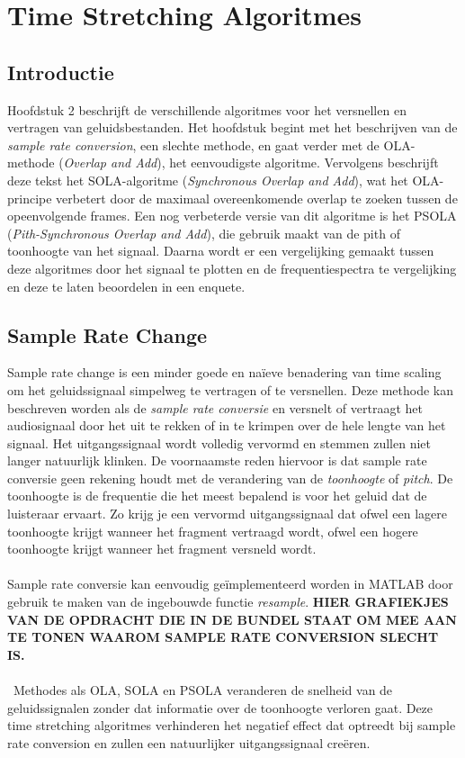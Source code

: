 \documentclass[12pt]{report}
\begin{document}
\chapter{Time Stretching Algoritmes}
\section{Introductie}
Hoofdstuk 2 beschrijft de verschillende algoritmes voor het versnellen en vertragen van geluidsbestanden. Het hoofdstuk begint met het beschrijven van de \textit{sample rate conversion}, een slechte methode, en gaat verder met de OLA-methode (\textit{Overlap and Add}), het eenvoudigste algoritme. Vervolgens beschrijft deze tekst het SOLA-algoritme (\textit{Synchronous Overlap and Add}), wat het OLA-principe verbetert door de maximaal overeenkomende overlap te zoeken tussen de opeenvolgende frames. Een nog verbeterde versie van dit algoritme is het PSOLA (\textit{Pith-Synchronous Overlap and Add}), die gebruik maakt van de pith of toonhoogte van het signaal. Daarna wordt er een vergelijking gemaakt tussen deze algoritmes door het signaal te plotten en de frequentiespectra te vergelijking en deze te laten beoordelen in een enquete. 


\section{Sample Rate Change}
Sample rate change is een minder goede en na\"{i}eve benadering van time scaling om het geluidssignaal simpelweg te vertragen of te versnellen. Deze methode kan beschreven worden als de \textit{sample rate conversie} en versnelt of vertraagt het audiosignaal door het uit te rekken of in te krimpen over de hele lengte van het signaal. Het uitgangssignaal wordt volledig vervormd en stemmen zullen niet langer natuurlijk klinken. De voornaamste reden hiervoor is dat sample rate conversie geen rekening houdt met de verandering van de \textit{toonhoogte} of \textit{pitch}. De toonhoogte is de frequentie die het meest bepalend is voor het geluid dat de luisteraar ervaart. Zo krijg je een vervormd uitgangssignaal dat ofwel een lagere toonhoogte krijgt wanneer het fragment vertraagd wordt, ofwel een hogere toonhoogte krijgt wanneer het fragment versneld wordt.\\
\\
Sample rate conversie kan eenvoudig ge\"{i}mplementeerd worden in MATLAB door gebruik te maken van de ingebouwde functie \textit{resample}. \textbf{HIER GRAFIEKJES VAN DE OPDRACHT DIE IN DE BUNDEL STAAT OM MEE AAN TE TONEN WAAROM SAMPLE RATE CONVERSION SLECHT IS.} \\
\\\
Methodes als OLA, SOLA en PSOLA veranderen de snelheid van de geluidssignalen zonder dat informatie over de toonhoogte verloren gaat. Deze time stretching algoritmes verhinderen het negatief effect dat optreedt bij sample rate conversion en zullen een natuurlijker uitgangssignaal cre\"{e}ren.
\end{document}
